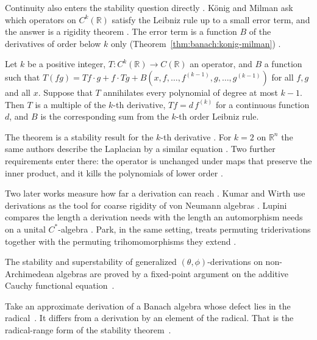 Continuity also enters the stability question directly
\cite[p.~405]{KonigMilman2014Derivation}. K\"onig and Milman
ask which operators on $C^k(\mathbb{R})$ satisfy the Leibniz rule up to a
small error term, and the answer is a rigidity theorem
\cite[p.~405]{KonigMilman2014Derivation}. The error term is a function $B$ of
the derivatives of order below $k$ only (Theorem~\ref{thm:banach:konig-milman})
\cite[p.~407]{KonigMilman2014Derivation}.\begin{theorem}\label{thm:banach:konig-milman}
Let $k$ be a positive integer, $T\colon C^k(\mathbb{R})\to C(\mathbb{R})$ an
operator, and $B$ a function such that
$T(fg)=Tf\cdot g+f\cdot Tg+B(x,f,\dots,f^{(k-1)},g,\dots,g^{(k-1)})$ for all
$f,g$ and all $x$. Suppose that $T$ annihilates every polynomial of degree at
most $k-1$. Then $T$ is a multiple of the $k$-th derivative, $Tf=d\,f^{(k)}$
for a continuous function $d$, and $B$ is the corresponding sum from the
$k$-th order Leibniz rule.
\end{theorem}

The theorem is a stability result for the $k$-th derivative
\cite[p.~407]{KonigMilman2014Derivation}. For $k=2$ on $\mathbb{R}^n$ the same
authors describe the Laplacian by a similar equation
\cite[p.~405]{KonigMilman2014Derivation}. Two further requirements enter
there: the operator is unchanged under maps that preserve the inner product,
and it kills the polynomials of lower order
\cite[p.~405]{KonigMilman2014Derivation}.

Two later works measure how far a derivation can reach
\cite[Abstract, p.~1]{KumarWirth2026}. Kumar and Wirth use derivations as the
tool for coarse rigidity of von Neumann algebras
\cite[Abstract, p.~1]{KumarWirth2026}. Lupini compares the length a derivation
needs with the length an automorphism needs on a unital $C^{*}$-algebra
\cite[Abstract, p.~1]{Lupini2026Length}. Park, in the same setting, treats
permuting triderivations together with the permuting trihomomorphisms they
extend \cite[Abstract, p.~1]{Park2020Trideriv}.

The stability and superstability of generalized $(\theta,\phi)$-derivations on
non-Archimedean algebras are proved by a fixed-point argument on the additive
Cauchy functional equation~\cite{WlStabilityAndSuperstability2019}.

Take an approximate derivation of a Banach algebra whose defect lies in the
radical~\cite{WlApproximateDerivationsWithTheR2015}. It differs from a derivation by an element of the radical. That is
the radical-range form of the stability
theorem~\cite{WlApproximateDerivationsWithTheR2015}.

